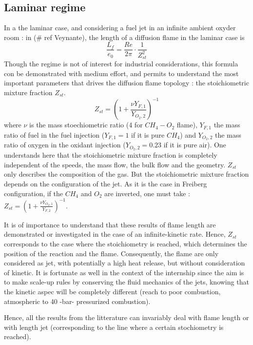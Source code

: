 \subsection{Laminar regime}
In a the laminar case, and considering a fuel jet in an infinite ambient oxyder room : in (\# ref Veynante), the length of a diffusion flame in the laminar case is 
\begin{equation} \label{eq:length_laminar}
\frac{L_{f}}{e_{0}}=\frac{Re}{2\pi}\cdot \frac{1}{Z_{st}^2}
\end{equation}
  Though the regime is not of interest for industrial considerations, this formula con be demonstrated with medium effort, and permits to understand the most important parameters that drives the diffusion flame topology : the stoichiometric mixture fraction $Z_{st}$.
  \begin{equation}
Z_{st}=(1+\frac{\nu Y_{F,1}}{Y_{O_{2},2}})^{-1}
\end{equation}
  where $\nu$ is the mass stoechiometric ratio (4 for $CH_{4}-O_{2}$ flame),    $Y_{F,1}$ the mass ratio of fuel in the fuel injection ($Y_{F,1}=1$ if it is pure $CH_{4}$) and $Y_{O_{2},2}$ the mass ratio of oxygen in the oxidant injection ($Y_{O_{2},2}=0.23$ if it is pure air). One understands here that the stoichiometric mixture fraction is completely independent of the speeds, the mass flow, the bulk flow and the geometry. $Z_{st}$ only describes the composition of the gas. But the stoichiometric mixture fraction depends on the configuration of the jet. As it is the case in Freiberg configuration, if the $CH_{4}$ and $O_{2}$ are inverted, one must take :  $Z_{st}=(1+\frac{\nu Y_{O_{2},1}}{Y_{F,2}})^{-1}$.
  
It is of importance to understand that these results of flame length are demonstrated or investigated in the case of an infinite-kinetic rate. Hence, $Z_{st}$ corresponds to the case where the stoichiometry is reached, which determines the position of the reaction and the flame. Consequently, the flame are only considered as jet, with potentially a high heat release, but without consideration of kinetic. It is fortunate as well in the context of the internship since the aim is to make scale-up rules by conserving the fluid mechanics of the jets, knowing that the kinetic aspec will be completely different (reach to poor combustion, atmospheric to 40 -bar- pressurized combustion).

Hence, all the results from the litterature can invariably deal with flame length or with length jet (corresponding to the line where a certain stochiometry is reached).


